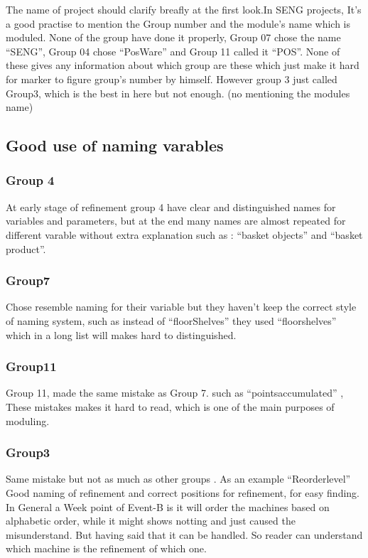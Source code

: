 The name of project should clarify breafly at the first look.In SENG projects, It's a good practise to mention the Group number and the module's name which is moduled. None of the group have done it properly, Group 07 chose the name “SENG”, Group 04 chose “PosWare” and Group 11 called it “POS”. None of these gives any information about which group are these which just make it hard for marker to figure group's number by himself. However group 3 just called Group3, which is the best in here but not enough. (no mentioning the modules name)

\subsection{Good use of naming varables}
\label{gooduseofnamingvarables}

\subsubsection{Group 4}
\label{group4}

At early stage of refinement group 4 have clear and distinguished names for variables and parameters, but at the end many names are almost repeated for different varable without extra explanation such as : “basket objects” and “basket product”. 

\subsubsection{Group7}
\label{group7}

Chose resemble naming for their variable but they haven't keep the correct style of naming system, such as instead of “floorShelves” they used “floorshelves” which in a long list will makes hard to distinguished. 

\subsubsection{Group11}
\label{group11}

Group 11, made the same mistake as Group 7. such as “pointsaccumulated” , These mistakes makes it hard to read, which is one of the main purposes of moduling. 

\subsubsection{Group3}
\label{group3}

Same mistake but not as much as other groups . As an example “Reorderlevel” Good naming of refinement and correct positions for refinement, for easy finding. In General a Week point of Event-B is it will order the machines based on alphabetic order, while it might shows notting and just caused the misunderstand. But having said that it can be handled. So reader can understand which machine is the refinement of which one.

